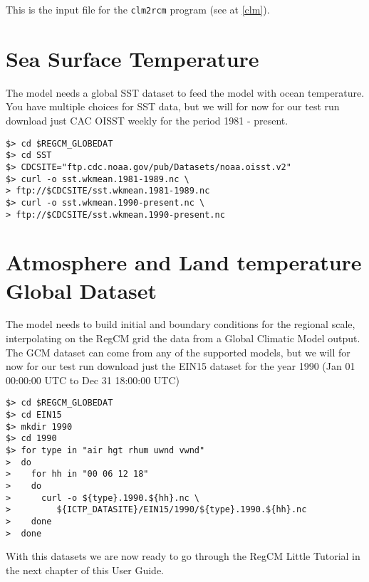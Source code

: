 This is the input file for the \verb=clm2rcm= program (see at \ref{clm}).

\section{Sea Surface Temperature}

The model needs a global SST dataset to feed the model with ocean temperature.
You have multiple choices for SST data, but we will for now for our test run
download just CAC OISST weekly for the period 1981 - present.

\begin{Verbatim}
$> cd $REGCM_GLOBEDAT
$> cd SST
$> CDCSITE="ftp.cdc.noaa.gov/pub/Datasets/noaa.oisst.v2"
$> curl -o sst.wkmean.1981-1989.nc \
> ftp://$CDCSITE/sst.wkmean.1981-1989.nc
$> curl -o sst.wkmean.1990-present.nc \
> ftp://$CDCSITE/sst.wkmean.1990-present.nc
\end{Verbatim}

\section{Atmosphere and Land temperature Global Dataset}

The model needs to build initial and boundary conditions for the regional scale,
interpolating on the RegCM grid the data from a Global Climatic Model output.
The GCM dataset can come from any of the supported models, but we will for now
for our test run download just the EIN15 dataset for the year 1990
(Jan 01 00:00:00 UTC to Dec 31 18:00:00 UTC)

\begin{Verbatim}
$> cd $REGCM_GLOBEDAT
$> cd EIN15
$> mkdir 1990
$> cd 1990
$> for type in "air hgt rhum uwnd vwnd"
>  do
>    for hh in "00 06 12 18"
>    do
>      curl -o ${type}.1990.${hh}.nc \
>         ${ICTP_DATASITE}/EIN15/1990/${type}.1990.${hh}.nc
>    done
>  done
\end{Verbatim}

With this datasets we are now ready to go through the RegCM Little Tutorial
in the next chapter of this User Guide.
